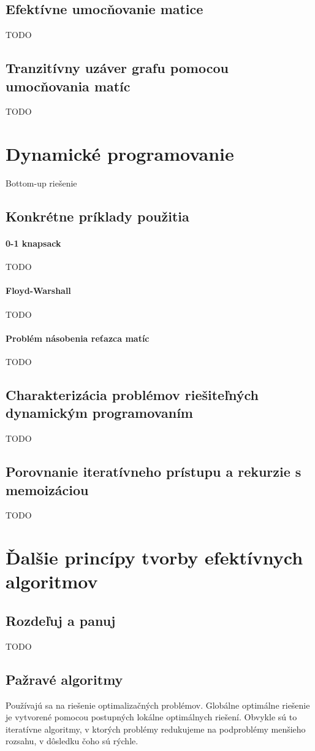 	\subsection{Efektívne umocňovanie matice} TODO
	\subsection{Tranzitívny uzáver grafu pomocou umocňovania matíc} TODO


\section{Dynamické programovanie}
	Bottom-up riešenie
	\subsection{Konkrétne príklady použitia} 
		\paragraph{0-1 knapsack} TODO
		\paragraph{Floyd-Warshall} TODO
		\paragraph{Problém násobenia reťazca matíc} TODO

	\subsection{Charakterizácia problémov riešiteľných dynamickým programovaním} TODO
	
	\subsection{Porovnanie iteratívneho prístupu a rekurzie s memoizáciou} TODO


\section{Ďalšie princípy tvorby efektívnych algoritmov}
	\subsection{Rozdeľuj a panuj}
	TODO
	\subsection{Pažravé algoritmy}
		Používajú sa na riešenie optimalizačných problémov. Globálne optimálne riešenie je vytvorené pomocou postupných lokálne optimálnych riešení. Obvykle sú to iteratívne algoritmy, v ktorých problémy redukujeme na podproblémy menšieho rozsahu, v dôsledku čoho sú rýchle.
